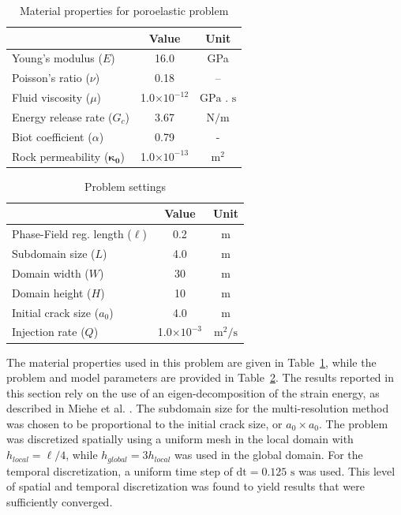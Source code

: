 \begin{table}[ht]
\centering
\caption{Material properties for poroelastic problem}
\begin{tabular}[t]{lcc}
\hline
&Value &Unit \\
\hline
Young's modulus ($E$)&16.0&GPa\\
Poisson's ratio ($\nu$)&0.18&--\\
Fluid viscosity ($\mu$)&1.0$\times10^{-12}$&$\text{GPa . s}$\\
Energy release rate ($G_c$)&3.67&$\text{N/m}$\\
Biot coefficient ($\alpha$)&0.79&$\text{ - }$\\
Rock permeability ($\boldsymbol{\kappa_0}$)&1.0$\times 10^{-13}$&$\text{m}^2$\\
\hline
\end{tabular}
\label{material properties miehe}
\end{table}%

\begin{table}[ht]
\centering
\caption{Problem settings}
\begin{tabular}[t]{lcc}
\hline
&Value &Unit \\
\hline
Phase-Field reg. length ($\ell$)&0.2&m\\
Subdomain size ($L$) &4.0&m\\
Domain width ($W$) &30&$\text{m}$\\
Domain height ($H$) &10&$\text{m}$\\
Initial crack size ($a_0$) &4.0&$\text{m}$\\
Injection rate ($Q$)&1.0$\times10^{-3}$&$\text{m}^2/\text{s}$\\
\hline
\end{tabular}
\label{geometry properties miehe}
\end{table}%

\medskip

The material properties used in this problem are given in Table~\ref{material properties miehe}, while the problem and model parameters are provided in Table~\ref{geometry properties miehe}.  The results reported in this section rely on the use of an eigen-decomposition of the strain energy, as described in Miehe et al. \cite{miehe2010phase}.  The subdomain size for the multi-resolution method was chosen to be proportional to the initial crack size, or $a_0 \times a_0$. The problem was discretized spatially using a uniform mesh  in the local domain with  $h_{local} = \ell/4$, while $h_{global} = 3h_{local}$ was used in the global domain. For the temporal discretization, a uniform time step of $\text{dt} = 0.125\text{ s}$ was used.  This level of spatial and temporal discretization was found to yield results that were sufficiently converged.  

